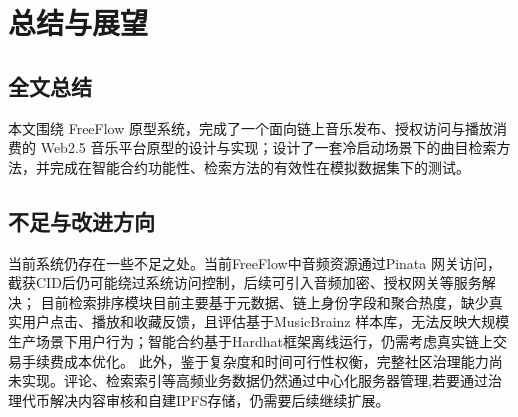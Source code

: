 
\chapter{总结与展望}


\section{全文总结}

本文围绕 FreeFlow 原型系统，完成了一个面向链上音乐发布、授权访问与播放消费的 Web2.5 音乐平台原型的设计与实现；设计了一套冷启动场景下的曲目检索方法，并完成在智能合约功能性、检索方法的有效性在模拟数据集下的测试。



\section{不足与改进方向}

当前系统仍存在一些不足之处。当前FreeFlow中音频资源通过Pinata 网关访问，截获CID后仍可能绕过系统访问控制，后续可引入音频加密、授权网关等服务解决； 目前检索排序模块目前主要基于元数据、链上身份字段和聚合热度，缺少真实用户点击、播放和收藏反馈，且评估基于MusicBrainz 样本库，无法反映大规模生产场景下用户行为；智能合约基于Hardhat框架离线运行，仍需考虑真实链上交易手续费成本优化。
此外，鉴于复杂度和时间可行性权衡，完整社区治理能力尚未实现。评论、检索索引等高频业务数据仍然通过中心化服务器管理,若要通过治理代币解决内容审核和自建IPFS存储，仍需要后续继续扩展。
